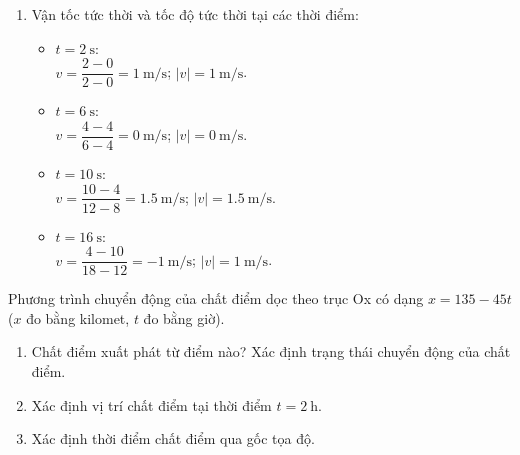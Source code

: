 \begin{ex}
{\begin{enumerate}[label=\alph*)]
		\item Vận tốc tức thời và tốc độ tức thời tại các thời điểm:
		\begin{itemize}
			\item $t=\SI{2}{\second}$:\\
			$v=\dfrac{2-0}{2-0}=\SI{1}{\meter/\second}$; $\left|v\right|=\SI{1}{\meter/\second}$.
			\item $t=\SI{6}{\second}$:\\
			$v=\dfrac{4-4}{6-4}=\SI{0}{\meter/\second}$; $\left|v\right|=\SI{0}{\meter/\second}$.
			\item $t=\SI{10}{\second}$:\\
			$v=\dfrac{10-4}{12-8}=\SI{1.5}{\meter/\second}$; $\left|v\right|=\SI{1.5}{\meter/\second}$.
			\item $t=\SI{16}{\second}$:\\
			$v=\dfrac{4-10}{18-12}=\SI{-1}{\meter/\second}$; $\left|v\right|=\SI{1}{\meter/\second}$.
		\end{itemize}
	\end{enumerate}
	}
\end{ex}
\begin{ex}
	Phương trình chuyển động của chất điểm dọc theo trục Ox có dạng $x=135-45t$ ($x$ đo bằng kilomet, $t$ đo bằng giờ).
	\begin{enumerate}[label=\alph*)]
		\item Chất điểm xuất phát từ điểm nào? Xác định trạng thái chuyển động của chất điểm.
		\item Xác định vị trí chất điểm tại thời điểm $t=\SI{2}{\hour}$.
		\item Xác định thời điểm chất điểm qua gốc tọa độ.
	\end{enumerate}
\end{ex}
